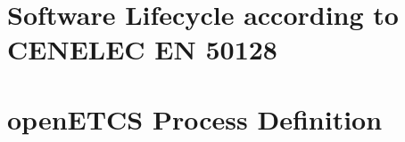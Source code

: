 \documentclass{template/openetcs_article}
\begin{document}
\section{Software Lifecycle according to CENELEC EN 50128}
\label{sec:sofware-lifecycle}


\section{openETCS Process Definition}
\label{sec:open-proc-defin}



%

\end{document}
